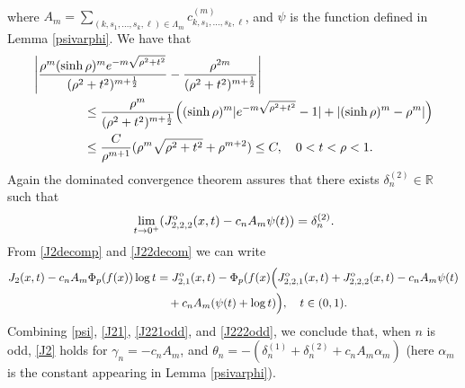 \documentclass[a4paper,10pt, reqno]{amsart}
\theoremstyle{definition}
\theoremstyle{remark}
\numberwithin{equation}{section}
\begin{document}
{\begin{align*}
\end{align*}
where $A_m=\sum_{(k,s_1,\ldots,s_k,\ell)\in \Lambda_m}c_{k,s_1,\ldots, s_k,\ell}^{(m)}$, and $\psi$ is the function defined in Lemma \ref{psivarphi}.
We have that
\begin{align*}
\left|\frac{\rho ^m(\sinh \rho )^me^{-m\sqrt{\rho ^2+t^2}}}{(\rho ^2+t^2)^{m+\frac{1}{2}}}-\frac{\rho ^{2m}}{(\rho ^2+t^2)^{m+\frac{1}{2}}}\right|&\\
&\hspace{-5cm}\leq \frac{\rho ^m}{(\rho ^2+t^2)^{m+\frac{1}{2}}}\Big((\sinh \rho )^m|e^{-m\sqrt{\rho ^2+t^2}}-1|+|(\sinh \rho )^m-\rho ^m|\Big)\\
&\hspace{-5cm}\leq \frac{C}{\rho ^{m+1}}(\rho ^m\sqrt{\rho ^2+t^2}+\rho ^{m+2})\leq C,\quad 0<t<\rho<1.
\end{align*}
Again the dominated convergence theorem assures that there exists $\delta_n^{(2)}\in \mathbb R$ such that
\begin{equation}\label{J222odd}
\lim_{t\rightarrow 0^+}(J_{2,2,2}^{\rm o}(x,t)-c_nA_m\psi (t))=\delta_n^{(2)}.
\end{equation}
From \eqref{J2decomp} and \eqref{J22decom} we can write
\begin{align*}
    J_2(x,t)-c_nA_m\Phi _p(f(x))\log t&=J_{2,1}^{\rm o}(x,t)-\Phi _p(f(x)\Big(J_{2,2,1}^{\rm o}(x,t)+J_{2,2,2}^{\rm o}(x,t)-c_nA_m\psi (t)\\
    &\quad +c_nA_m(\psi (t)+\log t)\Big),\quad t\in (0,1).
\end{align*}
Combining \eqref{psi}, \eqref{J21}, \eqref{J221odd}, and \eqref{J222odd}, we conclude that, when $n$ is odd, \eqref{J2} holds for $\gamma_n =-c_nA_m$, and $\theta_n =-(\delta_n^{(1)}+\delta_n^{(2)}+c_nA_m\alpha _m)$ (here $\alpha _m$ is the constant appearing in Lemma \ref{psivarphi}).

}
\end{document}

